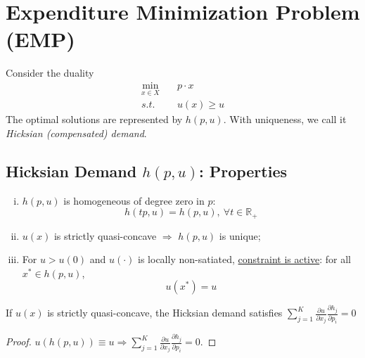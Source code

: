 \documentclass[11pt]{elegantbook}
\begin{document}
\section{Expenditure Minimization Problem (EMP)}
Consider the duality
\begin{equation}
    \begin{aligned}
        \min_{x\in X}\quad & p\cdot x\\
        s.t.\quad & u(x)\geq u
    \end{aligned}
    \tag{EMP}
    \label{EMP}
\end{equation}
The optimal solutions are represented by $h(p,u)$. With uniqueness, we call it \textit{Hicksian (compensated) demand}.

\subsection{Hicksian Demand $h(p,u)$: Properties}
\begin{proposition}
    \begin{enumerate}[(i).]
        \item $h(p,u)$ is homogeneous of degree zero in $p$: $$h(tp,u)=h(p,u),\ \forall t\in \mathbb{R}_+$$
        \item $u ( x )$ is strictly quasi-concave $\Rightarrow$ $h ( p, u )$ is unique;
        \item For $u>u(0)$ and $u(\cdot)$ is locally non-satiated, \underline{constraint is active}: for all $x^*\in h(p,u)$, $$u(x^*)=u$$
    \end{enumerate}
\end{proposition}

\begin{lemma}[$\sum_{j=1}^{K} \frac{\partial u}{\partial x_j} \frac{\partial h_{j}}{\partial p_{i}}=0$]
    If $u ( x )$ is strictly quasi-concave, the Hicksian demand satisfies $\sum_{j=1}^{K} \frac{\partial u}{\partial x_j} \frac{\partial h_{j}}{\partial p_{i}}=0$
\end{lemma}
\begin{proof}
    $u(h(p,u))\equiv u \Rightarrow \sum_{j=1}^{K} \frac{\partial u}{\partial x_j}\frac{\partial h_{j}}{\partial p_{i}}=0$.
\end{proof}
\end{document}
